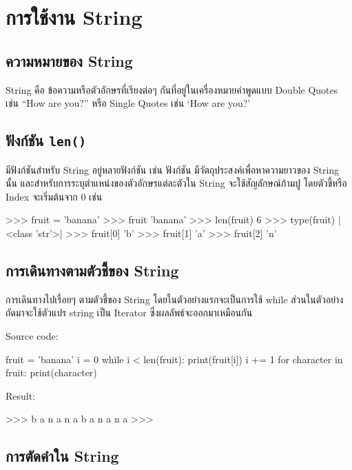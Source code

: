 \chapter{การใช้งาน String}
\section{ความหมายของ String}

String คือ ข้อความหรือตัวอักษรที่เรียงต่อๆ กันที่อยู่ในเครื่องหมายคำพูดแบบ Double Quotes เช่น “How are you?” หรือ Single Quotes เช่น ‘How are you?’ 

\section{ฟังก์ชัน \texttt{len()}}

มีฟังก์ชันสำหรับ String อยู่หลายฟังก์ชัน เช่น ฟังก์ชัน  มีวัตถุประสงค์เพื่อหาความยาวของ String นั้น และสำหรับการระบุตำแหน่งของตัวอักษรแต่ละตัวใน String จะใช้สัญลักษณ์ก้ามปู \pyinline{[ ]} โดยตัวชี้หรือ Index จะเริ่มต้นจาก 0 เช่น 

\begin{pycode}
>>> fruit = 'banana'
>>> fruit
'banana'
>>> len(fruit)
6
>>> type(fruit)
|<class \rq{}str\rq{}>|
>>> fruit[0]
'b'
>>> fruit[1]
'a'
>>> fruit[2]
'n'
\end{pycode}


\section{การเดินทางตามตัวชี้ของ String}

การเดินทางไปเรื่อยๆ ตามตัวชี้ของ String โดยในตัวอย่างแรกจะเป็นการใช้ while ส่วนในตัวอย่างถัดมาจะใช้ตัวแปร string เป็น Iterator ซึ่งผลลัพธ์จะออกมาเหมือนกัน

Source code:
\begin{pycode}
fruit = 'banana'
i = 0
while i < len(fruit):
    print(fruit[i])
    i += 1
for character in fruit: print(character)
\end{pycode}

Result:
\begin{pycode}
>>>
b
a
n
a
n
a
b
a
n
a
n
a
>>>
\end{pycode}



\section{การตัดคำใน String}

